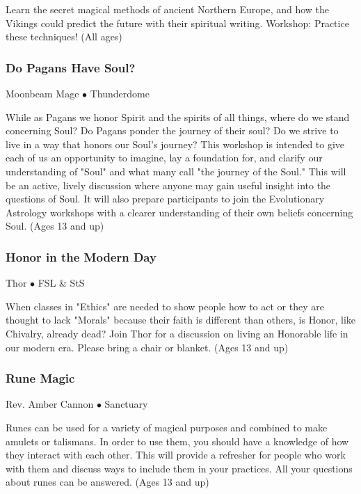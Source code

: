  Learn the secret magical methods of ancient Northern Europe, and how the Vikings could predict the future with their spiritual writing. Workshop: Practice these techniques! {\small (All ages)}

\subsubsection{Do Pagans Have Soul?}
\label{Thu-Mage1}
{\small Moonbeam Mage $\bullet$  Thunderdome}

 While as Pagans we honor Spirit and the spirits of all things, where do we stand concerning Soul? Do Pagans ponder the journey of their soul? Do we strive to live in a way that honors our Soul's journey? This workshop is intended to give each of us an opportunity to imagine, lay a foundation for, and clarify our understanding of "Soul" and what many call "the journey of the Soul." This will be an active, lively discussion where anyone may gain useful insight into the questions of Soul. It will also prepare participants to join the Evolutionary Astrology workshops with a clearer understanding of their own beliefs concerning Soul.  {\small (Ages 13 and up)}

\subsubsection{Honor in the Modern Day}
\label{Thu-Thor1}
{\small Thor $\bullet$  FSL \& StS}

 When classes in "Ethics" are needed to show people how to act or they are thought to lack "Morals" because their faith is different than others, is Honor, like Chivalry, already dead? Join Thor for a discussion on living an Honorable life in our modern era.  Please bring a chair or blanket. {\small (Ages 13 and up)}

\subsubsection{Rune Magic}
\label{Thu-Cannon1}
{\small Rev. Amber Cannon $\bullet$  Sanctuary}

 Runes can be used for a variety of magical purposes and combined to make amulets or talismans. In order to use them, you should have a knowledge of how they interact with each other. This will provide a refresher for people who work with them and discuss ways to include them in your practices. All your questions about runes can be answered.  {\small (Ages 13 and up)}

